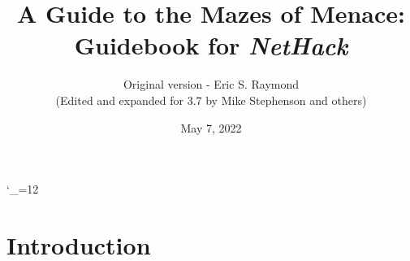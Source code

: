 \textheight 220mm
\textwidth 160mm
\oddsidemargin 0mm
\evensidemargin 0mm
\topmargin 0mm

\newcommand{\nd}{\noindent}

\newcommand{\tb}[1]{\tt #1 \hfill}
\newcommand{\bb}[1]{\bf #1 \hfill}
\newcommand{\ib}[1]{\it #1 \hfill}

\newcommand{\blist}[1]
{\begin{list}{$\bullet$}
    {\leftmargin 30mm \topsep 2mm \partopsep 0mm \parsep 0mm \itemsep 1mm
     \labelwidth 28mm \labelsep 2mm
     #1}}

\newcommand{\elist}{\end{list}}

\catcode`\_=12


%
%

\title{\LARGE A Guide to the Mazes of Menace:\\
\Large Guidebook for {\it NetHack\/}}

\author{Original version - Eric S. Raymond\\
(Edited and expanded for 3.7 by Mike Stephenson and others)}
\date{May 7, 2022}

\maketitle

\section{Introduction}


